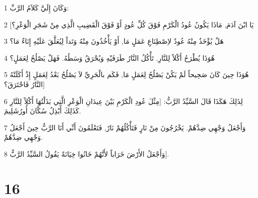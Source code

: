 \par 1 وَكَانَ إِلَيَّ كَلاَمُ الرَّبِّ:
\par 2 [يَا ابْنَ آدَمَ, مَاذَا يَكُونُ عُودُ الْكَرْمِ فَوْقَ كُلِّ عُودٍ أَوْ فَوْقَ الْقَضِيبِ الَّذِي مِنْ شَجَرِ الْوَعْرِ؟
\par 3 هَلْ يُؤْخَذُ مِنْهُ عُودٌ لاِصْطِنَاعِ عَمَلٍ مَا, أَوْ يَأْخُذُونَ مِنْهُ وَتَداً لِيُعَلَّقَ عَلَيْهِ إِنَاءٌ مَا؟
\par 4 هُوَذَا يُطْرَحُ أَكْلاً لِلنَّارِ. تَأْكُلُ النَّارُ طَرَفَيْهِ وَيُحْرَقُ وَسَطُهُ. فَهَلْ يَصْلُحُ لِعَمَلٍ؟
\par 5 هُوَذَا حِينَ كَانَ صَحِيحاً لَمْ يَكُنْ يَصْلُحُ لِعَمَلٍ مَا, فَكَم بالْحَرِيِّ لاَ يَصْلُحُ بَعْدُ لِعَمَلٍ إِذْ أَكَلَتْهُ النَّارُ فَاحْتَرَقَ؟]
\par 6 لِذَلِكَ هَكَذَا قَالَ السَّيِّدُ الرَّبُّ: [مِثْلَ عُودِ الْكَرْمِ بَيْنَ عِيدَانِ الْوَعْرِ الَّتِي بَذَلْتُهَا أَكْلاً لِلنَّارِ كَذَلِكَ أَبْذِلُ سُكَّانَ أُورُشَلِيمَ.
\par 7 وَأَجْعَلُ وَجْهِي ضِدَّهُمْ. يَخْرُجُونَ مِنْ نَارٍ فَتَأْكُلُهُمْ نَارٌ, فَتَعْلَمُونَ أَنِّي أَنَا الرَّبُّ حِينَ أَجْعَلُ وَجْهِي ضِدَّهُمْ.
\par 8 وَأَجْعَلُ الأَرْضَ خَرَاباً لأَنَّهُمْ خَانُوا خِيَانَةً يَقُولُ السَّيِّدُ الرَّبُّ].

\chapter{16}

